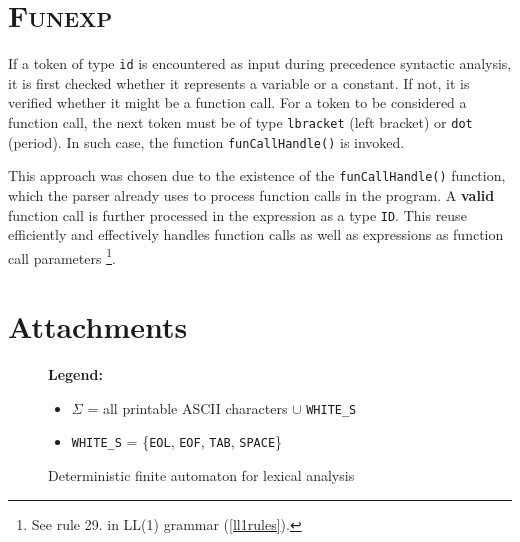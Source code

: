 \documentclass[a4paper, 11pt]{article}
\begin{document}
\section{\textsc{Funexp}}\label{sec:funexp}
If a token of type \verb|id| is encountered as input during precedence syntactic analysis, it is first checked whether it represents a variable 
or a constant. If not, it is verified whether it might be a function call. For a token to be considered a 
function call, the next token must be of type \verb|lbracket| (left bracket) or \verb|dot| (period). In such
case, the function \verb|funCallHandle()| is invoked.
\par
This approach was chosen due to the existence of the \verb|funCallHandle()| function, which the parser already 
uses to process function calls in the program. A \textbf{valid} function call is further processed in the expression 
as a type \verb|ID|. This reuse efficiently and effectively handles function calls as well as expressions as function call parameters
\footnote{See rule 29. in LL(1) grammar (\ref{ll1rules}).}.




\newpage
\section*{Attachments}
\begin{figure}[ht]
    \begin{center}

    \end{center}
    \textbf{Legend:}
    \begin{itemize}
    \item $\Sigma$ = all printable ASCII characters $\cup$ \verb|WHITE_S|
    \item \verb|WHITE_S| = \{\verb|EOL|, \verb|EOF|, \verb|TAB|, \verb|SPACE|\}
    \end{itemize}
    \caption{Deterministic finite automaton for lexical analysis}
    \label{automaton}
\end{figure}
\end{document}
